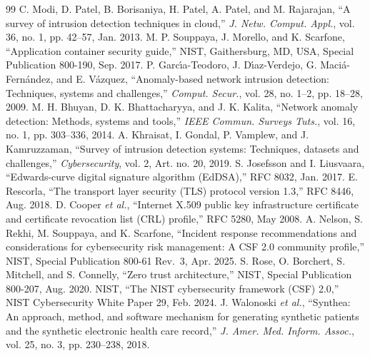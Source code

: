 \documentclass[journal]{IEEEtran}
\begin{document}
\begin{thebibliography}{99}
 C. Modi, D. Patel, B. Borisaniya, H. Patel, A. Patel, and M. Rajarajan, ``A survey of intrusion detection techniques in cloud,'' \emph{J. Netw. Comput. Appl.}, vol. 36, no. 1, pp. 42--57, Jan. 2013.
 M. P. Souppaya, J. Morello, and K. Scarfone, ``Application container security guide,'' NIST, Gaithersburg, MD, USA, Special Publication 800-190, Sep. 2017.
 P. Garc{\'\i}a-Teodoro, J. D{\'\i}az-Verdejo, G. Maci{\'a}-Fern{\'a}ndez, and E. V{\'a}zquez, ``Anomaly-based network intrusion detection: Techniques, systems and challenges,'' \emph{Comput. Secur.}, vol. 28, no. 1--2, pp. 18--28, 2009.
 M. H. Bhuyan, D. K. Bhattacharyya, and J. K. Kalita, ``Network anomaly detection: Methods, systems and tools,'' \emph{IEEE Commun. Surveys Tuts.}, vol. 16, no. 1, pp. 303--336, 2014.
 A. Khraisat, I. Gondal, P. Vamplew, and J. Kamruzzaman, ``Survey of intrusion detection systems: Techniques, datasets and challenges,'' \emph{Cybersecurity}, vol. 2, Art. no. 20, 2019.
 S. Josefsson and I. Liusvaara, ``Edwards-curve digital signature algorithm (EdDSA),'' RFC 8032, Jan. 2017.
 E. Rescorla, ``The transport layer security (TLS) protocol version 1.3,'' RFC 8446, Aug. 2018.
 D. Cooper \emph{et al.}, ``Internet X.509 public key infrastructure certificate and certificate revocation list (CRL) profile,'' RFC 5280, May 2008.
 A. Nelson, S. Rekhi, M. Souppaya, and K. Scarfone, ``Incident response recommendations and considerations for cybersecurity risk management: A CSF 2.0 community profile,'' NIST, Special Publication 800-61 Rev.~3, Apr. 2025.
 S. Rose, O. Borchert, S. Mitchell, and S. Connelly, ``Zero trust architecture,'' NIST, Special Publication 800-207, Aug. 2020.
 NIST, ``The NIST cybersecurity framework (CSF) 2.0,'' NIST Cybersecurity White Paper 29, Feb. 2024.
 J. Walonoski \emph{et al.}, ``Synthea: An approach, method, and software mechanism for generating synthetic patients and the synthetic electronic health care record,'' \emph{J. Amer. Med. Inform. Assoc.}, vol. 25, no. 3, pp. 230--238, 2018.
\end{thebibliography}
\end{document}
